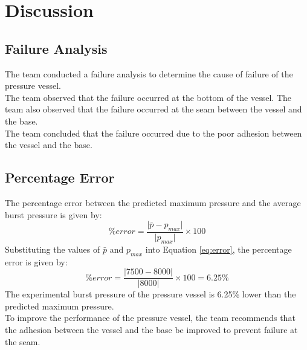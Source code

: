 \documentclass[12pt, titlepage]{article}
\begin{document}
\section{Discussion}
\subsection{Failure Analysis}
The team conducted a failure analysis to determine the cause of failure of the
pressure vessel.\\[10pt]
The team observed that the failure occurred at the bottom of the vessel. The
team also observed that the failure occurred at the seam between the vessel and
the base.\\[10pt]
The team concluded that the failure occurred due to the poor adhesion between
the vessel and the base.
\subsection{Percentage Error}
The percentage error between the predicted maximum pressure and the average
burst pressure is given by:
\begin{equation}
    \% error = \frac{\lvert\bar{p} - p_{max}\rvert}{\lvert p_{max}\rvert} \times 100
    \label{eq:error}
\end{equation}
Substituting the values of $\bar{p}$ and $p_{max}$ into Equation \ref{eq:error},
the percentage error is given by:
\begin{equation}
    \% error = \frac{\lvert 7500 - 8000\rvert}{\lvert 8000\rvert} \times 100 = 6.25\%
    \label{eq:error_value}
\end{equation}
The experimental burst pressure of the pressure vessel is 6.25\%
lower than the predicted maximum pressure.\\[10pt]
To improve the performance of the pressure vessel, the team recommends that the
adhesion between the vessel and the base be improved to prevent failure at the
seam.
\newpage
\end{document}
